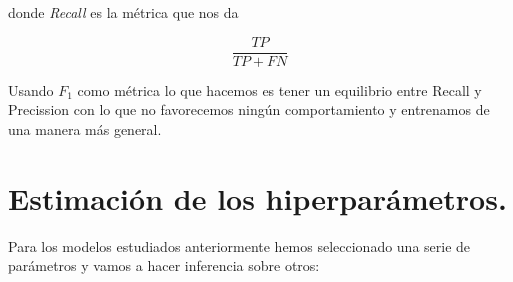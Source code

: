 \documentclass[a4paper,11pt]{article}
\begin{document}
donde \textit{Recall} es la métrica que nos da 

\[
    \frac{TP}{TP+FN}
\]

Usando $F_1$ como métrica lo que hacemos es tener un equilibrio entre Recall y
Precission con lo que no favorecemos ningún comportamiento y entrenamos de una manera 
más general.

\section{Estimación de los hiperparámetros.}


Para los modelos estudiados anteriormente hemos seleccionado una serie de
parámetros y vamos a hacer inferencia sobre otros:
\end{document}
